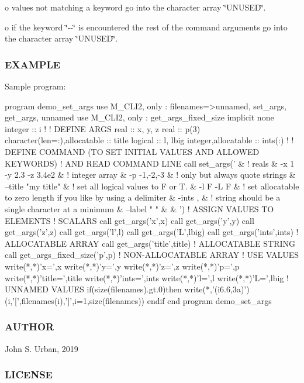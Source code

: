 o values not matching a keyword go into the character array \char`\"{}\+U\+N\+U\+S\+E\+D\char`\"{}.

o if the keyword \char`\"{}-\/-\/\char`\"{} is encountered the rest of the command arguments go into the character array \char`\"{}\+U\+N\+U\+S\+E\+D\char`\"{}.

\subsubsection*{E\+X\+A\+M\+P\+LE}

Sample program\+: \begin{DoxyVerb}program demo_set_args
use M_CLI2,  only : filenames=>unnamed, set_args, get_args, unnamed
use M_CLI2,  only : get_args_fixed_size
implicit none
integer                      :: i
!
! DEFINE ARGS
real                         :: x, y, z
real                         :: p(3)
character(len=:),allocatable :: title
logical                      :: l, lbig
integer,allocatable          :: ints(:)
!
!  DEFINE COMMAND (TO SET INITIAL VALUES AND ALLOWED KEYWORDS)
!  AND READ COMMAND LINE
call set_args(' &
   ! reals
   & -x 1 -y 2.3 -z 3.4e2 &
   ! integer array
   & -p -1,-2,-3 &
   ! only but always quote strings
   & --title "my title" &
   ! set all logical values to F or T.
   & -l F -L F &
   ! set allocatable to zero length if you like by using a delimiter
   & -ints , &
   ! string should be a single character at a minimum
   & --label " " &
   & ')
! ASSIGN VALUES TO ELEMENTS
!     SCALARS
call get_args('x',x)
call get_args('y',y)
call get_args('z',z)
call get_args('l',l)
call get_args('L',lbig)
call get_args('ints',ints)      ! ALLOCATABLE ARRAY
call get_args('title',title)    ! ALLOCATABLE STRING
call get_args_fixed_size('p',p) ! NON-ALLOCATABLE ARRAY
! USE VALUES
write(*,*)'x=',x
write(*,*)'y=',y
write(*,*)'z=',z
write(*,*)'p=',p
write(*,*)'title=',title
write(*,*)'ints=',ints
write(*,*)'l=',l
write(*,*)'L=',lbig
! UNNAMED VALUES
if(size(filenames).gt.0)then
   write(*,'(i6.6,3a)')(i,'[',filenames(i),']',i=1,size(filenames))
endif
end program demo_set_args
\end{DoxyVerb}


\subsubsection*{A\+U\+T\+H\+OR}

John S. Urban, 2019 \subsubsection*{L\+I\+C\+E\+N\+SE}

